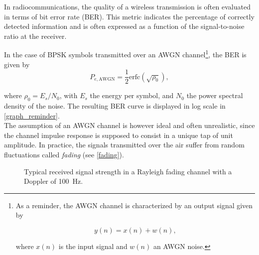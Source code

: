 \documentclass [a4paper, 11pt] {article}
\begin{document}
    \makesessiontitle
    
    \begin{reminder}
 
    In radiocommunications, the quality of a wireless transmission is often evaluated in terms of bit error rate (BER). This metric indicates the percentage of correctly detected information and is often expressed as a function of the signal-to-noise ratio at the receiver.
    
    
    In the case of BPSK symbols transmitted over an AWGN channel\footnote{As a reminder, the AWGN channel is characterized by an output signal given by 
    
    \begin{equation}
        y(n) = x(n) + w(n),
    \end{equation}
    
    
    where $x(n)$ is the input signal and $w(n)$ an AWGN noise.}, the BER is given by
    \begin{equation}
        P_{e,\text{AWGN}}= \frac{1}{2}\text{erfc}(\sqrt{\rho_0}),
    \end{equation}
    
    
    where $\rho_0 = E_s/N_0$, with $E_s$ the energy per symbol, and $N_0$ the power spectral density of the noise. The resulting BER curve is displayed in log scale in \autoref{graph_reminder}. \\
    
    
    The assumption of an AWGN channel is however ideal and often unrealistic, since the channel impulse response is supposed to consist in a unique tap of unit amplitude. In practice, the signals transmitted over the air suffer from random fluctuations called \textit{fading} (see \autoref{fading}).
    
    \begin{figure}[H]
        \centering
        \caption{Typical received signal strength in a Rayleigh fading channel with a Doppler of \SI{100}{\hertz}.}
        \label{fading}
    \end{figure}
    

\end{reminder}
\end{document}
